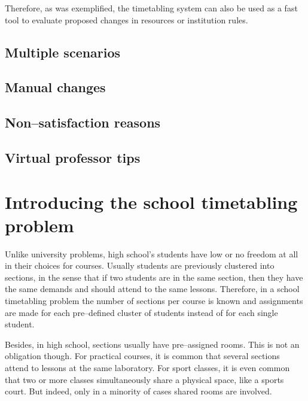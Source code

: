 Therefore, as was exemplified, the timetabling system can also be used as a fast  tool to evaluate proposed changes in resources or institution rules.


\subsection{Multiple scenarios}
\label{subsec:scenarios}



\subsection{Manual changes}
\label{subsec:manual}


\subsection{Non--satisfaction reasons}
\label{subsec:reasons}


\subsection{Virtual professor tips}
\label{subsec:tips}





\section{Introducing the school timetabling problem}
\label{deftriedaschool}


Unlike university problems, high school's students have low or no freedom at all in their choices for courses. Usually students are previously clustered into sections, in the sense that if two students are in the same section, then they have the same demands and should attend to the same lessons. Therefore, in a school timetabling problem the number of sections per course is known and assignments are made for each pre--defined cluster of students instead of for each single student.

Besides, in high school, sections usually have pre--assigned rooms. This is not an obligation though. For practical courses, it is common that several sections attend to lessons at the same laboratory. For sport classes, it is even common that two or more classes simultaneously share a physical space, like a sports court. But indeed, only in a minority of cases shared rooms are involved.


